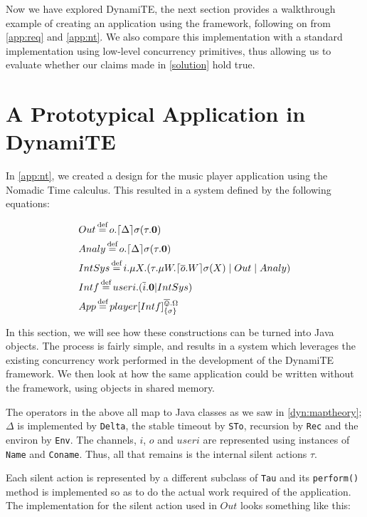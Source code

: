 Now we have explored DynamiTE, the next section provides a walkthrough
example of creating an application using the framework, following on
from \ref{app:req} and \ref{app:nt}.  We also compare this
implementation with a standard implementation using low-level
concurrency primitives, thus allowing us to evaluate whether our
claims made in \ref{solution} hold true.

\section{A Prototypical Application in DynamiTE}
\label{app:dynamite}

In \ref{app:nt}, we created a design for the music player application
using the Nomadic Time calculus.  This resulted in a system defined by
the following equations:

\begin{equation}
\label{app:eqn}
\begin{aligned}
  & Out \operatorname{\stackrel{\textrm{def}}{=}} o.\lceil{\Delta}\rceil {\sigma} ({\tau.\textbf{0}}) \\
  & Analy \operatorname{\stackrel{\textrm{def}}{=}} o.\lceil{\Delta}\rceil {\sigma} ({\tau.\textbf{0}}) \\
  & IntSys \operatorname{\stackrel{\textrm{def}}{=}} i.\mu X.(\tau.\mu W.\lceil{\overline{o}.W}\rceil {\sigma} ({X}) \;|\; Out \;|\; Analy) \\
  & Intf \operatorname{\stackrel{\textrm{def}}{=}} useri.(\overline{i}.\textbf{0} | IntSys) \\
  & App \operatorname{\stackrel{\textrm{def}}{=}} {player}[ Intf ]^{\overline{\varovee}.\Omega}_{\{\sigma\}} 
\end{aligned}
\end{equation}

In this section, we will see how these constructions can be turned
into Java objects.  The process is fairly simple, and results in a
system which leverages the existing concurrency work performed in the
development of the DynamiTE framework.  We then look at how the same
application could be written without the framework, using objects in
shared memory.

The operators in the above all map to Java classes as we saw in
\ref{dyn:maptheory}; $\Delta$ is implemented by \texttt{Delta}, the
stable timeout by \texttt{STo}, recursion by \texttt{Rec} and the
environ by \texttt{Env}.  The channels, $i$, $o$ and $useri$ are
represented using instances of \texttt{Name} and
\texttt{Coname}. Thus, all that remains is the internal silent actions
$\tau$.

Each silent action is represented by a different subclass of
\texttt{Tau} and its \texttt{perform()} method is implemented so as to
do the actual work required of the application.  The implementation
for the silent action used in $Out$ looks something like this:

